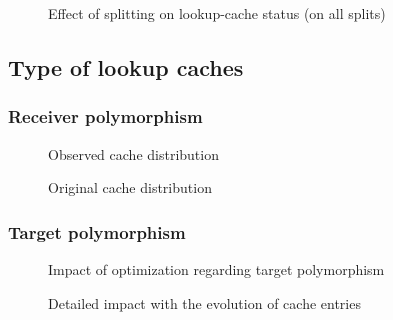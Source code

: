 \documentclass[preprint]{acmart}
\begin{document}
\begin{figure}[h]
  \centering
  \EffectSplittingFrequency
  \caption{
    Effect of splitting on lookup-cache status (on all splits)}
\end{figure}


\subsection{Type of lookup caches}

\subsubsection{Receiver polymorphism}

\begin{figure}[h!]
  \centering
  \CacheDistribObservedSplitting
  \caption{
    Observed cache distribution}
\end{figure}


\begin{figure}[h!]
  \centering
  \CacheDistribOriginalSplitting
  \caption{
    Original cache distribution}
\end{figure}


\subsubsection{Target polymorphism}

\begin{figure}[h!]
  \centering
  \TargetPolymorphism
  \caption{
    Impact of optimization regarding target polymorphism}
\end{figure}

\begin{landscape}
\begin{figure}[h]
  \centering
  \TargetPolymorphismDetails
  \caption{
    Detailed impact with the evolution of cache entries}
\end{figure}
\end{landscape}


%
%
\end{document}
